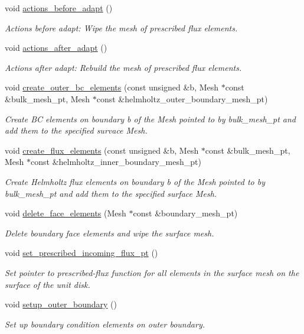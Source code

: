 \begin{DoxyCompactItemize}
void \hyperlink{classScatteringProblem_aca1b756a307f9c1d8a70c7b7e68a296b}{actions\+\_\+before\+\_\+adapt} ()
\begin{DoxyCompactList}\small\item\em Actions before adapt\+: Wipe the mesh of prescribed flux elements. \end{DoxyCompactList}\item 
void \hyperlink{classScatteringProblem_a13d8f85e74666c260de7364917359ed5}{actions\+\_\+after\+\_\+adapt} ()
\begin{DoxyCompactList}\small\item\em Actions after adapt\+: Rebuild the mesh of prescribed flux elements. \end{DoxyCompactList}\item 
void \hyperlink{classScatteringProblem_a408e05fbe1f1456ab7013a7e8ab29ccc}{create\+\_\+outer\+\_\+bc\+\_\+elements} (const unsigned \&b, Mesh $\ast$const \&bulk\+\_\+mesh\+\_\+pt, Mesh $\ast$const \&helmholtz\+\_\+outer\+\_\+boundary\+\_\+mesh\+\_\+pt)
\begin{DoxyCompactList}\small\item\em Create BC elements on boundary b of the Mesh pointed to by bulk\+\_\+mesh\+\_\+pt and add them to the specified survace Mesh. \end{DoxyCompactList}\item 
void \hyperlink{classScatteringProblem_af06ff518ad3250f914c0c659af3001c8}{create\+\_\+flux\+\_\+elements} (const unsigned \&b, Mesh $\ast$const \&bulk\+\_\+mesh\+\_\+pt, Mesh $\ast$const \&helmholtz\+\_\+inner\+\_\+boundary\+\_\+mesh\+\_\+pt)
\begin{DoxyCompactList}\small\item\em Create Helmholtz flux elements on boundary b of the Mesh pointed to by bulk\+\_\+mesh\+\_\+pt and add them to the specified surface Mesh. \end{DoxyCompactList}\item 
void \hyperlink{classScatteringProblem_aaef8a78e317333ddadd0be6a500c1134}{delete\+\_\+face\+\_\+elements} (Mesh $\ast$const \&boundary\+\_\+mesh\+\_\+pt)
\begin{DoxyCompactList}\small\item\em Delete boundary face elements and wipe the surface mesh. \end{DoxyCompactList}\item 
void \hyperlink{classScatteringProblem_ae75307dde909513a0f11057c96cdd622}{set\+\_\+prescribed\+\_\+incoming\+\_\+flux\+\_\+pt} ()
\begin{DoxyCompactList}\small\item\em Set pointer to prescribed-\/flux function for all elements in the surface mesh on the surface of the unit disk. \end{DoxyCompactList}\item 
void \hyperlink{classScatteringProblem_a76bd8299ea7ed559681b294acfb2aad4}{setup\+\_\+outer\+\_\+boundary} ()
\begin{DoxyCompactList}\small\item\em Set up boundary condition elements on outer boundary. \end{DoxyCompactList}\end{DoxyCompactItemize}
